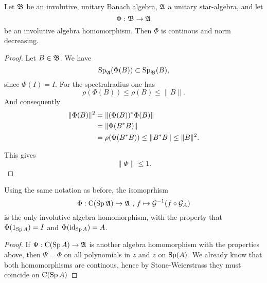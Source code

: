 \begin{prop}
 Let $\mathfrak{B}$ be an involutive, unitary Banach algebra, $\mathfrak{A}$ a unitary star-algebra, and let
\[
  \Phi : \mathfrak{B} \to \mathfrak{A} 
\]
be an involutive algebra homomorphism.
Then $\Phi$ is continous and norm decreasing.
\end{prop}
\begin{proof}
 Let $B \in \mathfrak{B}$. We have
\[
  \operatorname{Sp}_{\mathfrak{A}} (\Phi (B)) \subset \operatorname{Sp}_{\mathfrak{B}} (B),
\]
since $\Phi(I)=I$. For the spectralradius one has
\[
 \rho (\Phi (B)) \leq \rho ( B) \leq \| B \|.
\]
And consequently
\begin{align*}
 \| \Phi (B) \|^2 &= \| (\Phi (B))^{*} \Phi (B) \| \\
		  &= \| \Phi (B ^{*} B) \| \\
		  &= \rho ( \Phi(B ^{*} B)) \leq \| B^{*} B \| \leq \| B \| ^2.
\end{align*}

This gives 
\[
 \| \Phi \| \leq 1.
\]
\end{proof}
\begin{cor}
 Using the same notation as before, the isomoprhism
 \[
  \Phi : \operatorname{C} ( \operatorname{Sp} \mathfrak{A}) \to \mathfrak{A} \text{ , } f \mapsto \mathcal{G} ^{-1} (f \circ \mathcal{G}_A)
 \]
is the only involutive algebra homomorphism, with the property that \vspace{10 pt} $ \Phi ( 1_{\operatorname{Sp} A} ) =  I$  and $\Phi ( \operatorname{id} _{ \operatorname{Sp} A }) = A$.
 
\end{cor}

\begin{proof}
 If $\Psi : \operatorname{C} ( \operatorname{Sp} A) \to \mathfrak{A}$ is another algebra homomorphism with the properties above, then $\Psi = \Phi$ on all polynomials in $z$ and $\overline{z}$ on $\operatorname{Sp} (A)$. We already know that both homomorphisms are continous, hence by Stone-Weierstrass they must coincide on $\operatorname{C} ( \operatorname{Sp} A )$
\end{proof}





